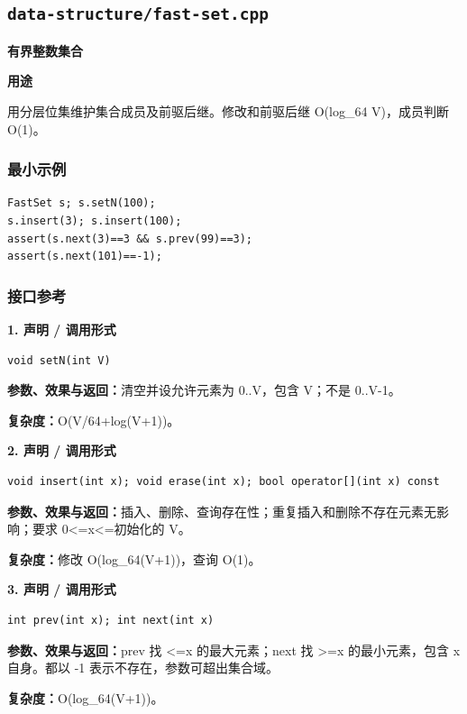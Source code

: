 \documentclass[UTF8,a4paper,10pt]{ctexart}
\newcommand{\TemplUsage}[1]{\textbf{用途}\par #1\par}
\begin{document}
\subsection{\texttt{data-structure/fast-set.cpp}}
\textbf{有界整数集合}\par
\TemplUsage{用分层位集维护集合成员及前驱后继。修改和前驱后继 O(log\_64 V)，成员判断 O(1)。}
\subsubsection*{最小示例}
\begin{lstlisting}
FastSet s; s.setN(100);
s.insert(3); s.insert(100);
assert(s.next(3)==3 && s.prev(99)==3);
assert(s.next(101)==-1);
\end{lstlisting}
\subsubsection*{接口参考}
\noindent\begin{minipage}{\textwidth}
\textbf{1. 声明 / 调用形式}
\begin{lstlisting}
void setN(int V)
\end{lstlisting}
\textbf{参数、效果与返回：}清空并设允许元素为 0..V，包含 V；不是 0..V-1。

\textbf{复杂度：}O(V/64+log(V+1))。

\end{minipage}\par\vspace{0.4em}
\noindent\begin{minipage}{\textwidth}
\textbf{2. 声明 / 调用形式}
\begin{lstlisting}
void insert(int x); void erase(int x); bool operator[](int x) const
\end{lstlisting}
\textbf{参数、效果与返回：}插入、删除、查询存在性；重复插入和删除不存在元素无影响；要求 0<=x<=初始化的 V。

\textbf{复杂度：}修改 O(log\_64(V+1))，查询 O(1)。

\end{minipage}\par\vspace{0.4em}
\noindent\begin{minipage}{\textwidth}
\textbf{3. 声明 / 调用形式}
\begin{lstlisting}
int prev(int x); int next(int x)
\end{lstlisting}
\textbf{参数、效果与返回：}prev 找 <=x 的最大元素；next 找 >=x 的最小元素，包含 x 自身。都以 -1 表示不存在，参数可超出集合域。

\textbf{复杂度：}O(log\_64(V+1))。

\end{minipage}\par\vspace{0.4em}
\end{document}

